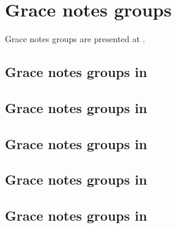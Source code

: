 



\chapter{Grace notes groups}\label{Grace notes groups}

Grace notes groups are presented at .


\section{Grace notes groups in \mxsrToMsr{}}


\section{Grace notes groups in \mxsrToMsr{}}


\section{Grace notes groups in \msrToMsr{}}


\section{Grace notes groups in \msrToLpsr{}}


\section{Grace notes groups in \lpsrToLilypond{}}


